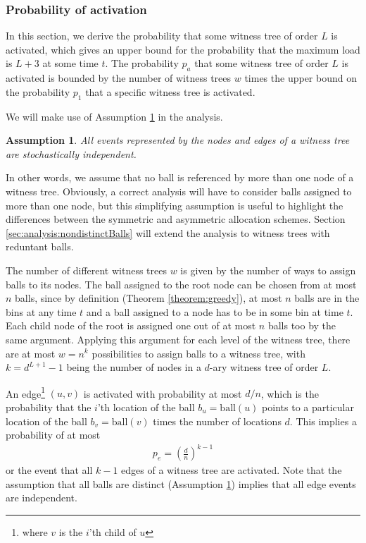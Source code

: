 \documentclass[a4paper,12pt]{article}
\newtheorem{assumption}{Assumption}
\begin{document}
\subsubsection{Probability of activation}
\label{sec:probabilitySymWT}
In this section, we derive the probability that some witness tree of order $L$ is activated, which gives an upper bound for the probability that the maximum load is $L+3$ at some time $t$. The probability $p_a$ that some witness tree of order $L$ is activated is bounded by the number of witness trees $w$ times the upper bound on the probability $p_1$ that a specific witness tree is activated.

We will make use of Assumption \ref{assumption:independence} in the analysis. 
\begin{assumption}
\label{assumption:independence}
All events represented by the nodes and edges of a witness tree are stochastically independent. 
\end{assumption}
In other words, we assume that no ball is referenced by more than one node of a witness tree. Obviously, a correct analysis will have to consider balls assigned to more than one node, but this simplifying assumption is useful to highlight the differences between the symmetric and asymmetric allocation schemes. Section \ref{sec:analysis:nondistinctBalls} will extend the analysis to witness trees with reduntant balls.

The number of different witness trees $w$ is given by the number of ways to assign balls to its nodes. The ball assigned to the root node can be chosen from at most $n$ balls, since by definition (Theorem \ref{theorem:greedy}), at most $n$ balls are in the bins at any time $t$ and a ball assigned to a node has to be in some bin at time $t$. Each child node of the root is assigned one out of at most $n$ balls too by the same argument. Applying this argument for each level of the witness tree, there are at most $w = n^k$ possibilities to assign balls to a witness tree, with $k = d^{L+1}-1$ being the number of nodes in a $d$-ary witness tree of order $L$.
 
An edge\footnote{where $v$ is the $i$'th child of $u$} $(u, v)$ is activated with probability at most $d/n$, which is the probability that the $i$'th location of the ball $b_u = \mathrm{ball}(u)$ points to a particular location of the ball $b_v = \mathrm{ball}(v)$ times the number of locations $d$. This implies a probability of at most
\begin{align}
p_e = \left(\frac{d}{n}\right)^{k-1}
\end{align} 
or the event that all $k-1$ edges of a witness tree are activated. Note that  the assumption that all balls are distinct (Assumption \ref{assumption:independence}) implies that all edge events are independent.
\end{document}
